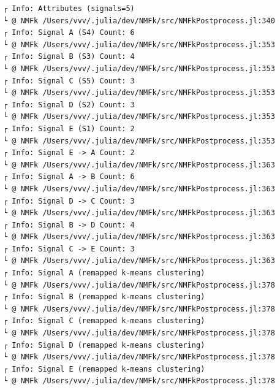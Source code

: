 \documentclass[11pt]{article}
\begin{document}
    \begin{Verbatim}[commandchars=\\\{\}]
┌ Info: Attributes (signals=5)
└ @ NMFk /Users/vvv/.julia/dev/NMFk/src/NMFkPostprocess.jl:340
┌ Info: Signal A (S4) Count: 6
└ @ NMFk /Users/vvv/.julia/dev/NMFk/src/NMFkPostprocess.jl:353
┌ Info: Signal B (S3) Count: 4
└ @ NMFk /Users/vvv/.julia/dev/NMFk/src/NMFkPostprocess.jl:353
┌ Info: Signal C (S5) Count: 3
└ @ NMFk /Users/vvv/.julia/dev/NMFk/src/NMFkPostprocess.jl:353
┌ Info: Signal D (S2) Count: 3
└ @ NMFk /Users/vvv/.julia/dev/NMFk/src/NMFkPostprocess.jl:353
┌ Info: Signal E (S1) Count: 2
└ @ NMFk /Users/vvv/.julia/dev/NMFk/src/NMFkPostprocess.jl:353
┌ Info: Signal E -> A Count: 2
└ @ NMFk /Users/vvv/.julia/dev/NMFk/src/NMFkPostprocess.jl:363
┌ Info: Signal A -> B Count: 6
└ @ NMFk /Users/vvv/.julia/dev/NMFk/src/NMFkPostprocess.jl:363
┌ Info: Signal D -> C Count: 3
└ @ NMFk /Users/vvv/.julia/dev/NMFk/src/NMFkPostprocess.jl:363
┌ Info: Signal B -> D Count: 4
└ @ NMFk /Users/vvv/.julia/dev/NMFk/src/NMFkPostprocess.jl:363
┌ Info: Signal C -> E Count: 3
└ @ NMFk /Users/vvv/.julia/dev/NMFk/src/NMFkPostprocess.jl:363
┌ Info: Signal A (remapped k-means clustering)
└ @ NMFk /Users/vvv/.julia/dev/NMFk/src/NMFkPostprocess.jl:378
┌ Info: Signal B (remapped k-means clustering)
└ @ NMFk /Users/vvv/.julia/dev/NMFk/src/NMFkPostprocess.jl:378
┌ Info: Signal C (remapped k-means clustering)
└ @ NMFk /Users/vvv/.julia/dev/NMFk/src/NMFkPostprocess.jl:378
┌ Info: Signal D (remapped k-means clustering)
└ @ NMFk /Users/vvv/.julia/dev/NMFk/src/NMFkPostprocess.jl:378
┌ Info: Signal E (remapped k-means clustering)
└ @ NMFk /Users/vvv/.julia/dev/NMFk/src/NMFkPostprocess.jl:378
    \end{Verbatim}

    \begin{center}
    \end{center}
    { \hspace*{\fill} \\}
    
    \begin{Verbatim}[commandchars=\\\{\}]

    \end{Verbatim}

    \begin{center}
    \end{center}
    { \hspace*{\fill} \\}
    
\end{document}
